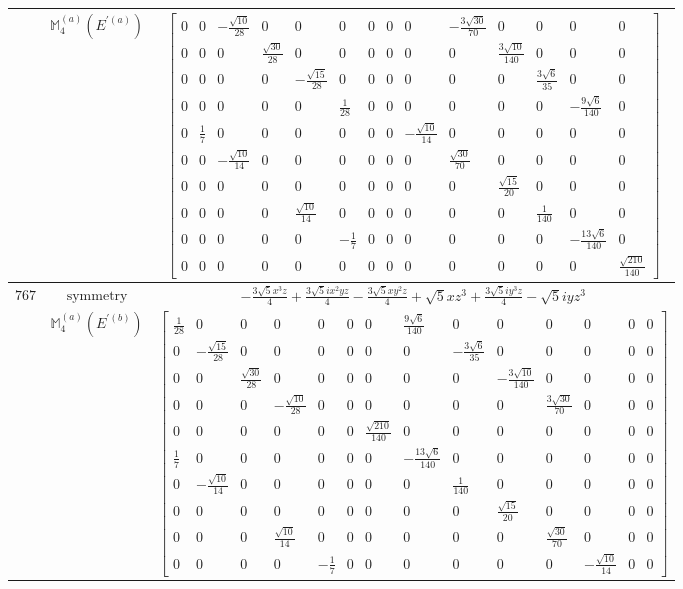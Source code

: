 \documentclass[fleqn,8pt,landscape]{jsarticle}
\begin{document}
\begin{longtable}{ccc}
$  $ & $ \mathbb{M}_{4}^{(a)}(E^{\prime(a)}) $ & $ \begin{bmatrix} 0 & 0 & - \frac{\sqrt{10}}{28} & 0 & 0 & 0 & 0 & 0 & 0 & - \frac{3 \sqrt{30}}{70} & 0 & 0 & 0 & 0 \\ 0 & 0 & 0 & \frac{\sqrt{30}}{28} & 0 & 0 & 0 & 0 & 0 & 0 & \frac{3 \sqrt{10}}{140} & 0 & 0 & 0 \\ 0 & 0 & 0 & 0 & - \frac{\sqrt{15}}{28} & 0 & 0 & 0 & 0 & 0 & 0 & \frac{3 \sqrt{6}}{35} & 0 & 0 \\ 0 & 0 & 0 & 0 & 0 & \frac{1}{28} & 0 & 0 & 0 & 0 & 0 & 0 & - \frac{9 \sqrt{6}}{140} & 0 \\ 0 & \frac{1}{7} & 0 & 0 & 0 & 0 & 0 & 0 & - \frac{\sqrt{10}}{14} & 0 & 0 & 0 & 0 & 0 \\ 0 & 0 & - \frac{\sqrt{10}}{14} & 0 & 0 & 0 & 0 & 0 & 0 & \frac{\sqrt{30}}{70} & 0 & 0 & 0 & 0 \\ 0 & 0 & 0 & 0 & 0 & 0 & 0 & 0 & 0 & 0 & \frac{\sqrt{15}}{20} & 0 & 0 & 0 \\ 0 & 0 & 0 & 0 & \frac{\sqrt{10}}{14} & 0 & 0 & 0 & 0 & 0 & 0 & \frac{1}{140} & 0 & 0 \\ 0 & 0 & 0 & 0 & 0 & - \frac{1}{7} & 0 & 0 & 0 & 0 & 0 & 0 & - \frac{13 \sqrt{6}}{140} & 0 \\ 0 & 0 & 0 & 0 & 0 & 0 & 0 & 0 & 0 & 0 & 0 & 0 & 0 & \frac{\sqrt{210}}{140} \end{bmatrix} $ \\ \hline
$ 767 $ & $ \text{symmetry} $ & $ - \frac{3 \sqrt{5} x^{3} z}{4} + \frac{3 \sqrt{5} i x^{2} y z}{4} - \frac{3 \sqrt{5} x y^{2} z}{4} + \sqrt{5} x z^{3} + \frac{3 \sqrt{5} i y^{3} z}{4} - \sqrt{5} i y z^{3} $ \\
$  $ & $ \mathbb{M}_{4}^{(a)}(E^{\prime(b)}) $ & $ \begin{bmatrix} \frac{1}{28} & 0 & 0 & 0 & 0 & 0 & 0 & \frac{9 \sqrt{6}}{140} & 0 & 0 & 0 & 0 & 0 & 0 \\ 0 & - \frac{\sqrt{15}}{28} & 0 & 0 & 0 & 0 & 0 & 0 & - \frac{3 \sqrt{6}}{35} & 0 & 0 & 0 & 0 & 0 \\ 0 & 0 & \frac{\sqrt{30}}{28} & 0 & 0 & 0 & 0 & 0 & 0 & - \frac{3 \sqrt{10}}{140} & 0 & 0 & 0 & 0 \\ 0 & 0 & 0 & - \frac{\sqrt{10}}{28} & 0 & 0 & 0 & 0 & 0 & 0 & \frac{3 \sqrt{30}}{70} & 0 & 0 & 0 \\ 0 & 0 & 0 & 0 & 0 & 0 & \frac{\sqrt{210}}{140} & 0 & 0 & 0 & 0 & 0 & 0 & 0 \\ \frac{1}{7} & 0 & 0 & 0 & 0 & 0 & 0 & - \frac{13 \sqrt{6}}{140} & 0 & 0 & 0 & 0 & 0 & 0 \\ 0 & - \frac{\sqrt{10}}{14} & 0 & 0 & 0 & 0 & 0 & 0 & \frac{1}{140} & 0 & 0 & 0 & 0 & 0 \\ 0 & 0 & 0 & 0 & 0 & 0 & 0 & 0 & 0 & \frac{\sqrt{15}}{20} & 0 & 0 & 0 & 0 \\ 0 & 0 & 0 & \frac{\sqrt{10}}{14} & 0 & 0 & 0 & 0 & 0 & 0 & \frac{\sqrt{30}}{70} & 0 & 0 & 0 \\ 0 & 0 & 0 & 0 & - \frac{1}{7} & 0 & 0 & 0 & 0 & 0 & 0 & - \frac{\sqrt{10}}{14} & 0 & 0 \end{bmatrix} $ \\ \hline

\end{longtable}
\end{document}
